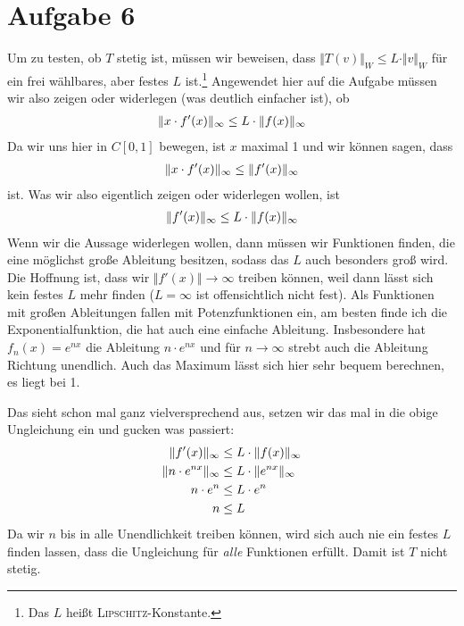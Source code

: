 \documentclass{article}
\begin{document}
	\section*{Aufgabe 6}
	Um zu testen, ob $T$ stetig ist, müssen wir beweisen, dass $\Vert T(v)\Vert_W \le L\cdot \Vert v\Vert_W$ für ein frei wählbares, aber festes $L$ ist.\footnote{Das $L$ heißt \textsc{Lipschitz}-Konstante.} Angewendet hier auf die Aufgabe müssen wir also zeigen oder widerlegen (was deutlich einfacher ist), ob
	\begin{align}
		\Vert x\cdot f'(x)\Vert_\infty \le L\cdot \Vert f(x)\Vert_\infty \notag
	\end{align}
	Da wir uns hier in $C[0,1]$ bewegen, ist $x$ maximal 1 und wir können sagen, dass
	\begin{align}
		\Vert x\cdot f'(x)\Vert_\infty \le \Vert f'(x)\Vert_\infty \notag
	\end{align}
	ist. Was wir also eigentlich zeigen oder widerlegen wollen, ist
	\begin{align}
		\Vert f'(x)\Vert_\infty \le L\cdot \Vert f(x)\Vert_\infty \notag
	\end{align}
	Wenn wir die Aussage widerlegen wollen, dann müssen wir Funktionen finden, die eine möglichst große Ableitung besitzen, sodass das $L$ auch besonders groß wird. Die Hoffnung ist, dass wir $\Vert f'(x)\Vert \to \infty$ treiben können, weil dann lässt sich kein festes $L$ mehr finden ($L=\infty$ ist offensichtlich nicht fest). Als Funktionen mit großen Ableitungen fallen mit Potenzfunktionen ein, am besten finde ich die Exponentialfunktion, die hat auch eine einfache Ableitung. Insbesondere hat $f_n(x) = e^{nx}$ die Ableitung $n\cdot e^{nx}$ und für $n\to\infty$ strebt auch die Ableitung Richtung unendlich. Auch das Maximum lässt sich hier sehr bequem berechnen, es liegt bei 1.
	
	Das sieht schon mal ganz vielversprechend aus, setzen wir das mal in die obige Ungleichung ein und gucken was passiert:
	\begin{align}
		\Vert f'(x)\Vert_\infty &\le L\cdot \Vert f(x)\Vert_\infty \notag \\
		\Vert n\cdot e^{nx}\Vert_\infty &\le L\cdot \Vert e^{nx}\Vert_\infty \notag \\
		n\cdot e^n &\le L\cdot e^n \notag \\
		n &\le L \notag
	\end{align}
	Da wir $n$ bis in alle Unendlichkeit treiben können, wird sich auch nie ein festes $L$ finden lassen, dass die Ungleichung für \textit{alle} Funktionen erfüllt. Damit ist $T$ nicht stetig.
	
\end{document}
